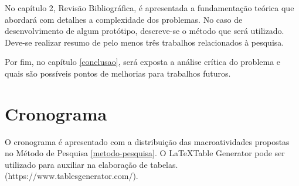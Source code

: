 No capítulo 2, Revisão Bibliográfica, é apresentada a fundamentação teórica que abordará com detalhes a complexidade dos problemas. No caso de desenvolvimento de algum protótipo, descreve-se o método que será utilizado. Deve-se realizar resumo de pelo menos três trabalhos relacionados à pesquisa.

Por fim, no capítulo \ref{conclusao}, será exposta a análise crítica do problema e quais são possíveis pontos de melhorias para trabalhos futuros.

\newpage
\section{Cronograma}
O cronograma é apresentado com a distribuição das macroatividades propostas no Método de Pesquisa \ref{metodo-pesquisa}. O \LaTeX Table Generator pode ser utilizado para auxiliar na elaboração de tabelas. (https://www.tablesgenerator.com/). 


